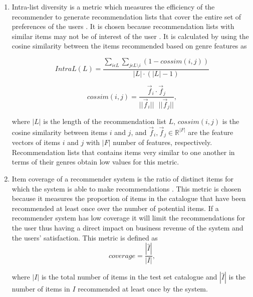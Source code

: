\documentclass[review]{elsarticle}
\begin{document}
\begin{enumerate}


    \item Intra-list diversity is a metric which measures the efficiency of the recommender to generate recommendation lists that cover the entire set of preferences of the users \citep{silveira2019good}. It is chosen because recommendation lists with similar items may not be of interest of the user \citep{silveira2019good}. It is calculated by using the cosine similarity between the items recommended based on genre features as \citep{deldjoo2019movie, silveira2019good}
    
          \begin{equation}
        IntraL(L) = \frac{\sum_{i\epsilon L} \sum_{j\epsilon L\setminus i}(1 - cossim(i,j))}{|L|\cdot (|L| - 1)}
    \end{equation}
    
    \begin{equation}
    cossim(i,j) = \frac{\vec{f}_i \cdot \vec{f}_j}{||\vec{f}_i||\mbox{ }||\vec{f}_j||},
    \label{eq:cosine_similarity}
    \end{equation}
    
    where $|L|$ is the length of the recommendation list $L$, $cossim(i,j)$ is the cosine similarity between items $i$ and $j$, and $\vec{f}_i, \vec{f}_j \in \mathbb{R}^{|F|}$  are the feature vectors of items $i$ and $j$ with $|F|$ number of features, respectively. Recommendation lists that contains items very similar to one another in terms of their genres obtain low values for this metric.\\ 
    
    
    \item Item coverage of a recommender system is the ratio of distinct items for which the system is able to make recommendations \citep{silveira2019good}. This metric is chosen because it measures the proportion of items in the catalogue that have been recommended at least once over the number of potential items. If a recommender system has low coverage it will limit the recommendations for the user thus having a direct impact on business revenue of the system and the users' satisfaction. This metric is defined as \citep{deldjoo2019movie, silveira2019good}
\begin{equation}
        coverage = \frac{|\hat{I}|}{|I|},
    \end{equation}
    
    where $|I|$ is the total number of items in the test set catalogue and $|\hat{I}|$ is the number of items in $I$ recommended at least once by the system.\\
    

\end{enumerate}
\end{document}
